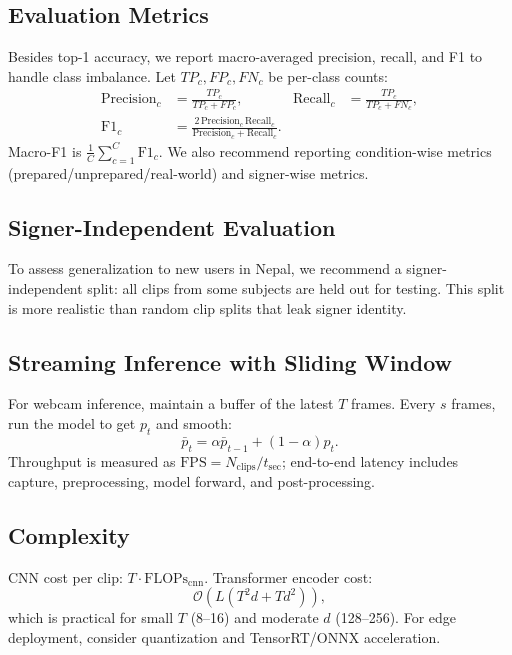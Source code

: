 \documentclass[conference]{IEEEtran}
\begin{document}
\subsection{Evaluation Metrics}
Besides top-1 accuracy, we report macro-averaged precision, recall, and F1 to handle class imbalance. Let $TP_c, FP_c, FN_c$ be per-class counts:
\begin{align}
\text{Precision}_c &= \frac{TP_c}{TP_c + FP_c}, &
\text{Recall}_c &= \frac{TP_c}{TP_c + FN_c}, \\
\text{F1}_c &= \frac{2\,\text{Precision}_c\,\text{Recall}_c}{\text{Precision}_c+\text{Recall}_c}.
\end{align}
Macro-F1 is $\frac{1}{C}\sum_{c=1}^{C}\text{F1}_c$. We also recommend reporting condition-wise metrics (prepared/unprepared/real-world) and signer-wise metrics.

\subsection{Signer-Independent Evaluation}
To assess generalization to new users in Nepal, we recommend a signer-independent split: all clips from some subjects are held out for testing. This split is more realistic than random clip splits that leak signer identity.

\subsection{Streaming Inference with Sliding Window}
For webcam inference, maintain a buffer of the latest $T$ frames. Every $s$ frames, run the model to get $p_t$ and smooth:
\begin{equation}
\bar{p}_t = \alpha \bar{p}_{t-1} + (1-\alpha)p_t.
\end{equation}
Throughput is measured as $\text{FPS} = N_{\text{clips}}/t_{\text{sec}}$; end-to-end latency includes capture, preprocessing, model forward, and post-processing.

\subsection{Complexity}
CNN cost per clip: $T\cdot \text{FLOPs}_{\text{cnn}}$. Transformer encoder cost:
\begin{equation}
\mathcal{O}\left(L(T^2 d + T d^2)\right),
\end{equation}
which is practical for small $T$ (8--16) and moderate $d$ (128--256). For edge deployment, consider quantization and TensorRT/ONNX acceleration.
\end{document}
